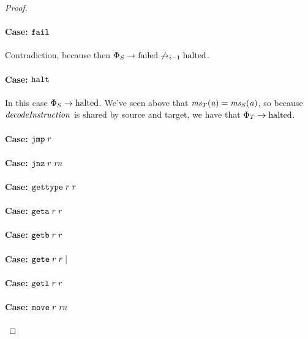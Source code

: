 \documentclass[a4paper]{article}
\begin{document}
\begin{proof}
\paragraph{Case: $\protect\tfail$}
Contradiction, because then $\Phi_S \step \failed \not\nstep[i-1] \halted$.

\paragraph{Case: $\protect\thalt$}
In this case $\Phi_S \step \halted$.
We've seen above that $\ms_T(\aaddr) = \ms_S(\aaddr)$, so because $\decInstr{}$ is shared by source and target, we have that $\Phi_T \step\halted$.

\paragraph{Case: $\protect\tjmp{\trg{r}}$}

\paragraph{Case: $\protect\tjnz{\trg{r}}{\trg{\rn}}$}

\paragraph{Case: $\protect\tisptr{\trg{r}}{\trg{r}}$}

\paragraph{Case: $\protect\tgeta{\trg{r}}{\trg{r}}$}

\paragraph{Case: $\protect\tgetb{\trg{r}}{\trg{r}}$}

\paragraph{Case: $\protect\tgete{\trg{r}}{\trg{r}}\mid$}

\paragraph{Case: $\protect\tgetlin{\trg{r}}{\trg{r}}$}

\paragraph{Case: $\protect\tmove{\trg{r}}{\trg{\rn}}$}


\end{proof}
\end{document}
